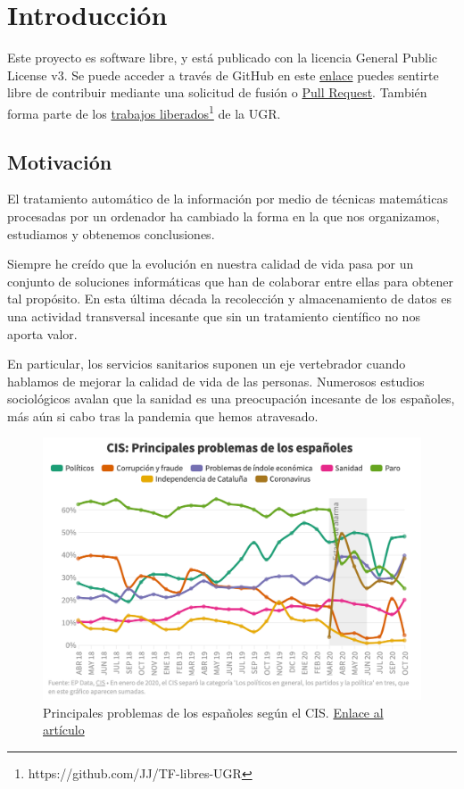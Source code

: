 \chapter{Introducción}
Este proyecto es software libre, y está publicado con la licencia \cite{gplv3} General Public License v3.
Se puede acceder a través de GitHub en este \href{https://github.com/pablojjimenez/TFG}{enlace} puedes sentirte libre de contribuir mediante una solicitud de fusión o \href{https://github.com/pablojjimenez/TFG/pulls}{Pull Request}. También forma parte de los \href{https://github.com/JJ/TF-libres-UGR}{trabajos liberados}\footnote{https://github.com/JJ/TF-libres-UGR} de la UGR.

\section{Motivación} 
El tratamiento automático de la información por medio de técnicas matemáticas procesadas por un ordenador ha cambiado la forma en la que nos organizamos, estudiamos y obtenemos conclusiones.

Siempre he creído que la evolución en nuestra calidad de vida pasa por un
conjunto de soluciones informáticas que han de colaborar entre ellas para obtener tal propósito. 
En esta última década la recolección y almacenamiento de datos es una actividad transversal incesante que sin un tratamiento científico no nos aporta valor. 

En particular, los servicios sanitarios suponen un eje vertebrador cuando hablamos de mejorar la calidad de vida de las personas. Numerosos estudios sociológicos avalan que la sanidad es una preocupación incesante de los españoles, más aún si cabo tras la pandemia que hemos atravesado.
\FloatBarrier
\begin{figure}[]
	\centering	
	\includegraphics[scale=0.5]{doc/logos/imgs/CIS_1.png}
	\caption{ 
        Principales problemas de los españoles según el CIS. \href{https://www.rtve.es/noticias/20201015/crisis-economica-coronavirus-preocupan-ahora-mas-espanoles-paro/2045610.shtml}{Enlace al artículo}
    }
    \label{fig:problemascis}
\end{figure}
\FloatBarrier

